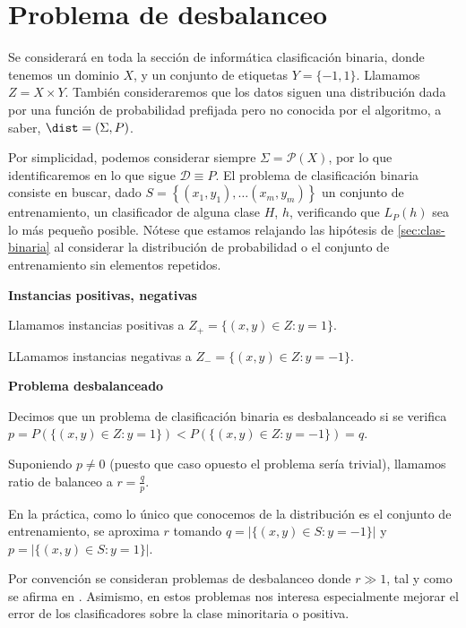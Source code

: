 \section{Problema de desbalanceo}

Se considerará en toda la sección de informática clasificación binaria, donde tenemos un dominio $X$, y un conjunto de etiquetas 
$Y=\{-1,1\}$. Llamamos $Z = X\times Y$. También consideraremos que los datos siguen una distribución dada por una función de 
probabilidad prefijada pero no conocida por el algoritmo, a saber, $\dist=(\Sigma, P)$. 

Por simplicidad, podemos considerar siempre $\Sigma = \mathcal{P}(X)$, por lo que identificaremos en lo que sigue $\mathcal{D} \equiv P$.
El problema de clasificación binaria consiste en buscar, dado $S= \left\{(x_1, y_1), \ldots (x_m, y_m)\right\}$ un 
conjunto de entrenamiento, un clasificador de alguna clase $H$, $h$, verificando que $L_{P}(h)$ sea lo más pequeño posible.
Nótese que estamos relajando las hipótesis de \ref{sec:clas-binaria} al considerar la distribución de probabilidad o el conjunto 
de entrenamiento sin elementos repetidos.

\begin{definition} \textbf{Instancias positivas, negativas}

Llamamos instancias positivas a $Z_{+} = \{(x,y)\in Z: y=1\}$.

LLamamos instancias negativas a $Z_{-} = \{(x,y)\in Z: y=-1\}$.
\end{definition}


\begin{definition} \textbf{Problema desbalanceado}

 Decimos que un problema de clasificación binaria es desbalanceado si se verifica 
 $p=P\left(\{(x,y) \in Z: y =1\}\right) < P\left(\{(x,y) \in Z: y = -1\}\right) = q$.

 Suponiendo $p\neq 0$ (puesto que caso opuesto el problema sería trivial), llamamos ratio de balanceo a 
 $r = \frac{q}{p}$.
 
 En la práctica, como lo único que conocemos de la distribución es el conjunto de entrenamiento, se aproxima
 $r$ tomando $q = |\{(x,y)\in S: y=-1\}|$ y $p = |\{(x,y)\in S: y=1\}|$.
 
\end{definition}

Por convención se consideran problemas de desbalanceo donde $r \gg 1$, tal y como se afirma en \cite{he2009}. Asimismo,
en estos problemas nos interesa especialmente mejorar el error de los clasificadores sobre la clase minoritaria o positiva.

